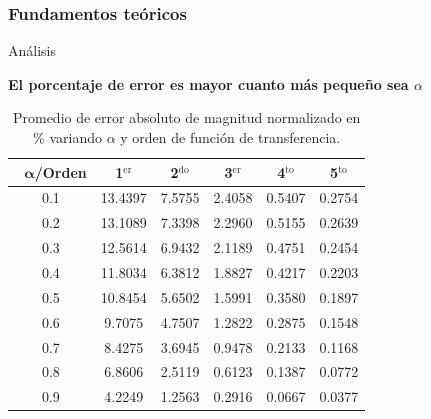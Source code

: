 \documentclass[10pt]{beamer}
\begin{document}
	\begin{frame}
		\frametitle{Fundamentos teóricos}
		\begin{block}{Análisis}	
		 \begin{center}
		 	\textbf{El porcentaje de error es mayor cuanto más pequeño sea $\alpha$}
		 \end{center}
		\begin{small}
		\vspace{-0.3cm}
		\begin{table}[!ht]                                 
		\centering            
		\caption{Promedio de error absoluto de magnitud normalizado en \% variando $\alpha$ y orden de función de transferencia.}                           
		\label{tab:prom_error_mag_norm}                               
			\begin{tabular}{cccccc}
				\hline                                             
				$\,\,\,\,\bm{\alpha}$\textbf{/Orden} & \textbf{1$^{\mathrm{er}}$} & \textbf{2$^{\mathrm{do}}$} & \textbf{3$^{\mathrm{er}}$} & \textbf{4$^{\mathrm{to}}$} & \textbf{5$^{\mathrm{to}}$} \\                     
				\hline                                             
				0.1 & 13.4397 & 7.5755 & 2.4058 & 0.5407 & 0.2754 \\
				                                         
				0.2 & 13.1089 & 7.3398 & 2.2960 & 0.5155 & 0.2639 \\
				                                              
				0.3 & 12.5614 & 6.9432 & 2.1189 & 0.4751 & 0.2454 \\
				                                            
				0.4 & 11.8034 & 6.3812 & 1.8827 & 0.4217 & 0.2203 \\
				                                            
				0.5 & 10.8454 & 5.6502 & 1.5991 & 0.3580 & 0.1897 \\
				                                           
				0.6 & 9.7075 & 4.7507 & 1.2822 & 0.2875 & 0.1548 \\ 
				                                         
				0.7 & 8.4275 & 3.6945 & 0.9478 & 0.2133 & 0.1168 \\ 
				                                              
				0.8 & 6.8606 & 2.5119 & 0.6123 & 0.1387 & 0.0772 \\ 
				                                             
				0.9 & 4.2249 & 1.2563 & 0.2916 & 0.0667 & 0.0377 \\ 
				\hline                                             
			\end{tabular}                                                             
		\end{table}
		\end{small}
		\end{block}
	\end{frame}	
\end{document}
